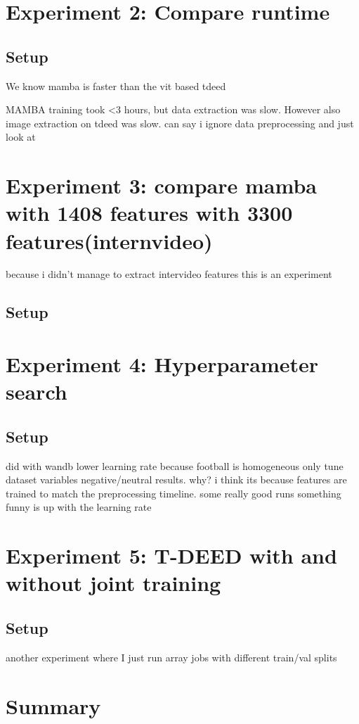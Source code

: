 \section{Experiment 2: Compare runtime}
\subsection{Setup}
\label{ssec:ex2_setup}

We know mamba is faster than the vit based tdeed

MAMBA training took <3 hours, but data extraction was slow. However also image extraction on tdeed was slow. can say i ignore data preprocessing and just look at 


\section{Experiment 3: compare mamba with 1408 features with 3300 features(internvideo)}
because i didn't manage to extract intervideo features this is an experiment


\subsection{Setup}
\label{ssec:ex3_setup}

\section{Experiment 4: Hyperparameter search}
\subsection{Setup}
\label{ssec:ex4_setup}

did with wandb
lower learning rate because football is homogeneous
only tune dataset variables
negative/neutral results. why? i think its because features are trained to match the preprocessing timeline. some really good runs
something funny is up with the learning rate

\section{Experiment 5: T-DEED with and without joint training}
\subsection{Setup}
\label{ssec:ex5_setup}

another experiment where I just run array jobs with different train/val splits

\section{Summary}

